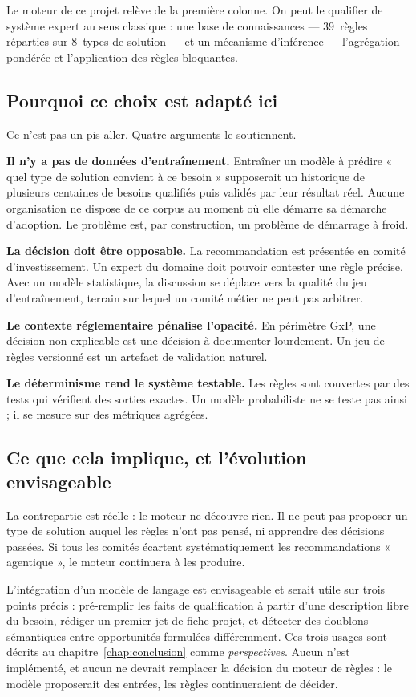 Le moteur de ce projet relève de la première colonne. On peut le qualifier de système
expert au sens classique : une base de connaissances — 39~règles réparties sur 8~types
de solution — et un mécanisme d'inférence — l'agrégation pondérée et l'application des
règles bloquantes.

\subsection{Pourquoi ce choix est adapté ici}

Ce n'est pas un pis-aller. Quatre arguments le soutiennent.

\textbf{Il n'y a pas de données d'entraînement.} Entraîner un modèle à prédire
« quel type de solution convient à ce besoin » supposerait un historique de plusieurs
centaines de besoins qualifiés puis validés par leur résultat réel. Aucune organisation
ne dispose de ce corpus au moment où elle démarre sa démarche d'adoption. Le problème
est, par construction, un problème de démarrage à froid.

\textbf{La décision doit être opposable.} La recommandation est présentée en comité
d'investissement. Un expert du domaine doit pouvoir contester une règle précise. Avec
un modèle statistique, la discussion se déplace vers la qualité du jeu d'entraînement,
terrain sur lequel un comité métier ne peut pas arbitrer.

\textbf{Le contexte réglementaire pénalise l'opacité.} En périmètre GxP, une décision
non explicable est une décision à documenter lourdement. Un jeu de règles versionné est
un artefact de validation naturel.

\textbf{Le déterminisme rend le système testable.} Les règles sont couvertes par des
tests qui vérifient des sorties exactes. Un modèle probabiliste ne se teste pas ainsi ;
il se mesure sur des métriques agrégées.

\subsection{Ce que cela implique, et l'évolution envisageable}

La contrepartie est réelle : le moteur ne découvre rien. Il ne peut pas proposer un type
de solution auquel les règles n'ont pas pensé, ni apprendre des décisions passées. Si
tous les comités écartent systématiquement les recommandations « agentique », le moteur
continuera à les produire.

L'intégration d'un modèle de langage est envisageable et serait utile sur trois points
précis : pré-remplir les faits de qualification à partir d'une description libre du
besoin, rédiger un premier jet de fiche projet, et détecter des doublons sémantiques
entre opportunités formulées différemment. Ces trois usages sont décrits au
chapitre~\ref{chap:conclusion} comme \emph{perspectives}. Aucun n'est implémenté, et
aucun ne devrait remplacer la décision du moteur de règles : le modèle proposerait des
entrées, les règles continueraient de décider.

